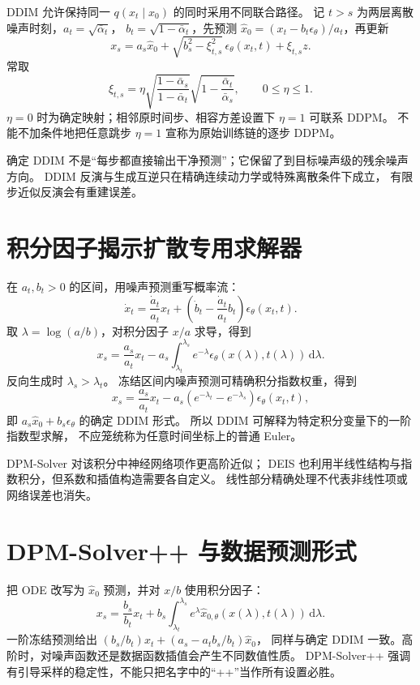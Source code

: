 DDIM 允许保持同一 $q(x_t\mid x_0)$ 的同时采用不同联合路径。
记 $t>s$ 为两层离散噪声时刻，$a_t=\sqrt{\bar\alpha_t}$，
$b_t=\sqrt{1-\bar\alpha_t}$，先预测
$\hat x_0=(x_t-b_t\epsilon_\theta)/a_t$，再更新
\begin{equation}\label{th:ddim}
x_s=a_s\hat x_0+\sqrt{b_s^2-\xi_{t,s}^2}\,\epsilon_\theta(x_t,t)
 +\xi_{t,s}z.
\end{equation}
常取
\[
\xi_{t,s}=\eta\sqrt{\frac{1-\bar\alpha_s}{1-\bar\alpha_t}}
 \sqrt{1-\frac{\bar\alpha_t}{\bar\alpha_s}},\qquad0\leq\eta\leq1.
\]
$\eta=0$ 时为确定映射；相邻原时间步、相容方差设置下 $\eta=1$ 可联系 DDPM。
不能不加条件地把任意跳步 $\eta=1$ 宣称为原始训练链的逐步 DDPM。

确定 DDIM 不是“每步都直接输出干净预测”；它保留了到目标噪声级的残余噪声方向。
DDIM 反演与生成互逆只在精确连续动力学或特殊离散条件下成立，
有限步近似反演会有重建误差。

\section{积分因子揭示扩散专用求解器}

在 $a_t,b_t>0$ 的区间，用噪声预测重写概率流：
\[
\dot x_t=\frac{\dot a_t}{a_t}x_t+
 \left(\dot b_t-\frac{\dot a_t}{a_t}b_t\right)\epsilon_\theta(x_t,t).
\]
取 $\lambda=\log(a/b)$，对积分因子 $x/a$ 求导，得到
\begin{equation}\label{th:dpm-integral}
x_s=\frac{a_s}{a_t}x_t
 -a_s\int_{\lambda_t}^{\lambda_s}
 e^{-\lambda}\epsilon_\theta(x(\lambda),t(\lambda))\,\mathrm d\lambda.
\end{equation}
反向生成时 $\lambda_s>\lambda_t$。
冻结区间内噪声预测可精确积分指数权重，得到
\[
x_s=\frac{a_s}{a_t}x_t-
 a_s(e^{-\lambda_t}-e^{-\lambda_s})\epsilon_\theta(x_t,t),
\]
即 $a_s\hat x_0+b_s\epsilon_\theta$ 的确定 DDIM 形式。
所以 DDIM 可解释为特定积分变量下的一阶指数型求解，
不应笼统称为任意时间坐标上的普通 Euler。

DPM-Solver 对该积分中神经网络项作更高阶近似；
DEIS 也利用半线性结构与指数积分，但系数和插值构造需要各自定义。
线性部分精确处理不代表非线性项或网络误差也消失。

\section{DPM-Solver++ 与数据预测形式}

把 ODE 改写为 $\hat x_0$ 预测，并对 $x/b$ 使用积分因子：
\begin{equation}\label{th:dpmpp-integral}
x_s=\frac{b_s}{b_t}x_t+
 b_s\int_{\lambda_t}^{\lambda_s}e^\lambda\hat x_{0,\theta}(x(\lambda),t(\lambda))
 \,\mathrm d\lambda.
\end{equation}
一阶冻结预测给出 $(b_s/b_t)x_t+(a_s-a_tb_s/b_t)\hat x_0$，
同样与确定 DDIM 一致。高阶时，对噪声函数还是数据函数插值会产生不同数值性质。
DPM-Solver++ 强调有引导采样的稳定性，不能只把名字中的“++”当作所有设置必胜。

